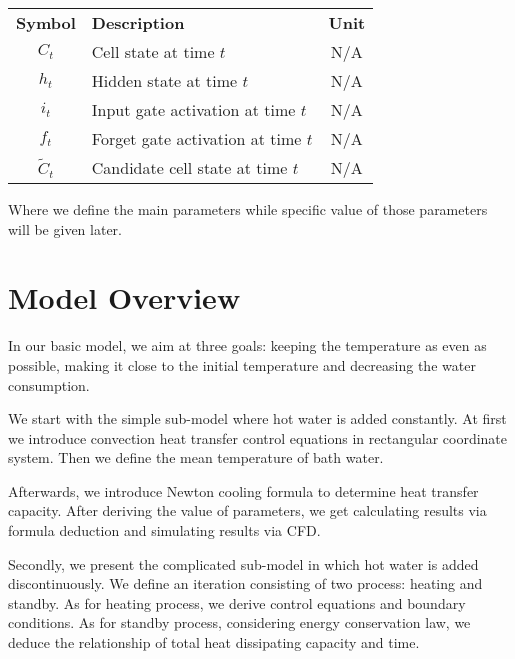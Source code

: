 \documentclass{mcmthesis}
\begin{document}
\begin{center}

    \begin{tabular}{clc}



        \textbf{Symbol} & \textbf{Description}                 & \textbf{Unit} \\ [0.25cm]



        \(C_t\)         & Cell state at time \(t\)             & N/A           \\ [0.25cm]

        \(h_t\)         & Hidden state at time \(t\)           & N/A           \\ [0.25cm]

        \(i_t\)         & Input gate activation at time \(t\)  & N/A           \\ [0.25cm]

        \(f_t\)         & Forget gate activation at time \(t\) & N/A           \\ [0.25cm]

        \(\tilde{C}_t\) & Candidate cell state at time \(t\)   & N/A           \\ [0.25cm]
    \end{tabular}

\end{center}

\noindent Where we define the main parameters while specific value of those parameters will be given later.

\section{Model Overview}

In our basic model, we aim at three goals: keeping the temperature as even as possible, making it close to the initial temperature and decreasing the water consumption.

We start with the simple sub-model where hot water is added constantly.
At first we introduce convection heat transfer control equations in rectangular coordinate system. Then we define the mean temperature of bath water.

Afterwards, we introduce Newton cooling formula to determine heat transfer
capacity. After deriving the value of parameters, we get calculating results via formula deduction and simulating results via CFD.

Secondly, we present the complicated sub-model in which hot water is
added discontinuously. We define an iteration consisting of two process:
heating and standby. As for heating process, we derive control equations and boundary conditions. As for standby process, considering energy conservation law, we deduce the relationship of total heat dissipating capacity and time.
\end{document}
